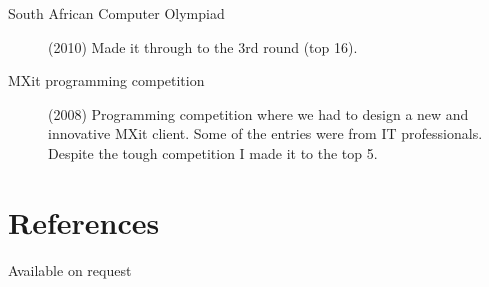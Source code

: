 \documentclass[margin,line,a4paper]{resume}
\begin{document}
\begin{resume}
\begin{description}
                \item [South African Computer Olympiad] (2010) Made it through to the 3rd
                round (top 16).

                \item [MXit programming competition] (2008) Programming competition where we
                had to design a new and innovative MXit client.  Some of the
                entries were from IT professionals. Despite the tough competition I made it to the top 5.
            \end{description}

        \section{\mysidestyle References}
            Available on request
    \end{resume}
\end{document}
